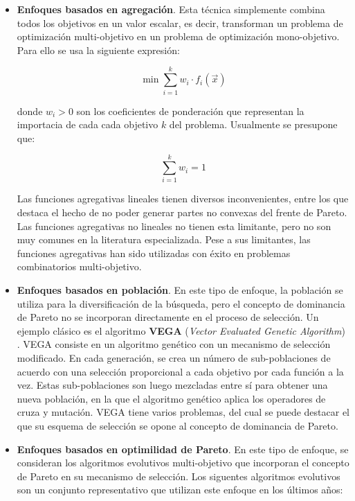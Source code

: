   \begin{itemize}
   \item \textbf{Enfoques basados en agregaci\'on}. Esta t\'ecnica simplemente combina todos los objetivos 
   en un valor escalar, es decir, transforman 
   un problema de optimizaci\'on multi-objetivo en un problema de optimizaci\'on mono-objetivo. Para ello se usa la siguiente 
   expresi\'on: 
   
	\[ \min {\sum^{k}_{i=1}{w_i\cdot f_i\left(\vec{x}\right)}}\]
   
   donde $w_i > 0$ son los coeficientes de ponderaci\'on que representan la importacia de cada cada objetivo $k$ del
   problema. Usualmente se presupone que:
   
   \[\sum^{k}_{i=1}{w_i}=1\]
   
   Las funciones agregativas lineales tienen diversos inconvenientes, entre los que destaca el hecho de no 
   poder generar partes no convexas del frente de Pareto. Las funciones agregativas no lineales no tienen esta limitante,
   pero no son muy comunes en la literatura especializada. Pese a sus limitantes, las funciones agregativas han sido utilizadas
   con \'exito en problemas combinatorios multi-objetivo.
   
   \item \textbf{Enfoques basados en poblaci\'on}. En este tipo de enfoque, la poblaci\'on se utiliza para la diversificaci\'on de la b\'usqueda, 
   pero el concepto de dominancia de Pareto no se incorporan directamente en el proceso de selecci\'on. Un ejemplo cl\'asico es el 
   algoritmo \textbf{VEGA} (\textit{Vector Evaluated Genetic Algorithm}) \cite{Schaffer84}. VEGA consiste en un algoritmo gen\'etico 
   con un mecanismo de selecci\'on modificado. En cada generaci\'on, se crea un n\'umero de sub-poblaciones de acuerdo con una 
   selecci\'on proporcional a cada objetivo por cada funci\'on a la vez. Estas sub-poblaciones son luego mezcladas entre s\'i para 
   obtener una nueva poblaci\'on, en la que el algoritmo gen\'etico aplica los operadores de cruza y mutaci\'on. VEGA tiene varios 
   problemas, del cual se puede destacar el que su esquema de selecci\'on se opone al concepto de dominancia de Pareto.
   
   \item \textbf{Enfoques basados en optimilidad de Pareto}. En este tipo de enfoque, se consideran los algoritmos evolutivos multi-objetivo que 
   incorporan el concepto de Pareto en su mecanismo de selecci\'on. Los siguentes algoritmos evolutivos son un conjunto representativo 
   que utilizan este enfoque en los \'ultimos a\~nos:
   

\end{itemize}
